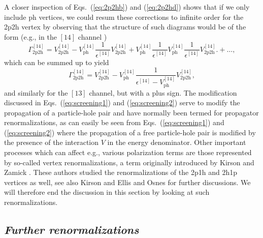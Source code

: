 \documentclass{article}
\begin{document}
A closer inspection of Eqs.\ (\ref{eq:2p2hb}) and
(\ref{eq:2p2hd}) shows that if we only include ph vertices,
we could resum these corrections to infinite
order for the 2p2h vertex by observing that the
structure of such diagrams would be of the form
(e.g., in the $[14]$ channel )
\begin{equation}
       \Gamma_{\mathrm{2p2h}}^{[14]}=V^{[14]}_{\mathrm{2p2h}}-
        V^{[14]}_{\mathrm{ph}}
        \frac{1}{\epsilon^{[14]}}
        V_{\mathrm{2p2h}}^{[14]}+
        V^{[14]}_{\mathrm{ph}}
        \frac{1}{\epsilon^{[14]}}
        V^{[14]}_{\mathrm{ph}}
        \frac{1}{\epsilon^{[14]}}
        V^{[14]}_{\mathrm{2p2h}}.
             +\dots,
\end{equation}
which can be summed up to yield
\begin{equation}
  \Gamma^{[14]}_{\mathrm{2p2h}}=V^{[14]}_{\mathrm{2p2h}}-
   V^{[14]}_{\mathrm{ph}}
   \frac{1}
   {\epsilon^{[14]}-V^{[14]}_{\mathrm{ph}}}
   V^{[14]}_{\mathrm{2p2h}},
   \label{eq:screening2}
\end{equation}
and similarly for the $[13]$ channel, but with a plus sign.
The modification discussed in Eqs.\ (\ref{eq:screening1})
and (\ref{eq:screening2})
serve to modify the propagation of a particle-hole pair
and have normally been termed for propagator
renormalizations, as can easily be seen from
Eqs.\ (\ref{eq:screening1})
and (\ref{eq:screening2}) where the propagation of
a free particle-hole pair is modified by the presence
of the interaction $V$ in the energy denominator.
Other important processes which can affect e.g.,
various polarization terms are those
represented by so-called vertex renormalizations,
a term originally introduced by Kirson and Zamick \cite{kz70}.
These authors studied the renormalizations of the
2p1h and 2h1p vertices as well, see also Kirson \cite{kirson74}
and Ellis and Osnes \cite{eo77} for further discussions.
We will therefore end the discussion in this section
by looking at such renormalizations.

\subsection{\it Further renormalizations}
\end{document}
